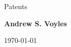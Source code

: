\documentclass{resume2} %
\newif\ifshort
\begin{document}

\shorttrue 

\begin{center}
{\Large Patents}

{\large \textbf{Andrew S. Voyles}}

\today
\end{center} 

\end{document}
